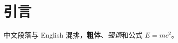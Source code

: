 \documentclass[UTF8]{ctexart}
\begin{document}
\section{引言}
中文段落与 English 混排，\textbf{粗体}、\emph{强调}和公式 $E = mc^2$。
\end{document}
